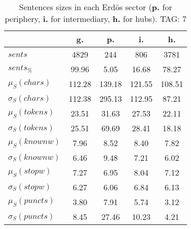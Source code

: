 \begin{table}[h!]
\begin{center}
\begin{tabular}{| l || c | c | c | c |}\hline
 & {\bf g.} & {\bf p.} & {\bf i.} & {\bf h.} \\\hline\hline
$sents$ & 4829  & 244  & 806  & 3781 \\
$sents_{\%}$ & 99.96  & 5.05  & 16.68  & 78.27 \\\hline
$\mu_S(chars)$ & 112.28  & 139.18  & 121.55  & 108.51 \\
$\sigma_S(chars)$ & 112.38  & 295.13  & 112.95  & 87.21 \\\hline
$\mu_S(tokens)$ & 23.51  & 31.63  & 27.53  & 22.11 \\
$\sigma_S(tokens)$ & 25.51  & 69.69  & 28.41  & 18.18 \\\hline
$\mu_S(knownw)$ & 7.96  & 8.52  & 8.40  & 7.82 \\
$\sigma_S(knownw)$ & 6.46  & 9.48  & 7.21  & 6.02 \\\hline
$\mu_S(stopw)$ & 7.27  & 6.95  & 8.04  & 7.12 \\
$\sigma_S(stopw)$ & 6.27  & 6.06  & 6.84  & 6.13 \\\hline
$\mu_S(puncts)$ & 3.80  & 7.91  & 5.74  & 3.12 \\
$\sigma_S(puncts)$ & 8.45  & 27.46  & 10.23  & 4.21 \\\hline
\end{tabular}
\caption{Sentences sizes in each Erd\"os sector ({{\bf p.}} for periphery, {{\bf i.}} for intermediary, {{\bf h.}} for hubs). TAG: 7}
\end{center}
\end{table}